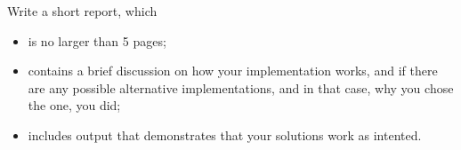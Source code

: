 Write a short report, which 
\begin{itemize}
\item is no larger than 5 pages;
\item contains a brief discussion on how your implementation works,
  and if there are any possible alternative implementations, and in that
  case, why you chose the one, you did;
\item includes output that demonstrates that your solutions work as intented.
\end{itemize}
